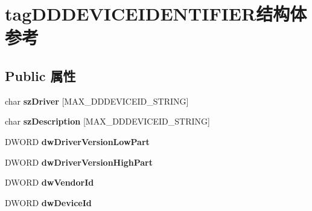 \hypertarget{structtag_d_d_d_e_v_i_c_e_i_d_e_n_t_i_f_i_e_r}{}\section{tag\+D\+D\+D\+E\+V\+I\+C\+E\+I\+D\+E\+N\+T\+I\+F\+I\+E\+R结构体 参考}
\label{structtag_d_d_d_e_v_i_c_e_i_d_e_n_t_i_f_i_e_r}
\subsection*{Public 属性}
\begin{DoxyCompactItemize}
\item 
\mbox{\label{structtag_d_d_d_e_v_i_c_e_i_d_e_n_t_i_f_i_e_r_ad63b03ed6997913f28b68de810a31218}} 
char {\bfseries sz\+Driver} \mbox{[}M\+A\+X\+\_\+\+D\+D\+D\+E\+V\+I\+C\+E\+I\+D\+\_\+\+S\+T\+R\+I\+NG\mbox{]}
\item 
\mbox{\label{structtag_d_d_d_e_v_i_c_e_i_d_e_n_t_i_f_i_e_r_a6b7aaa2fa4df62a09d9e05c65a55cd1d}} 
char {\bfseries sz\+Description} \mbox{[}M\+A\+X\+\_\+\+D\+D\+D\+E\+V\+I\+C\+E\+I\+D\+\_\+\+S\+T\+R\+I\+NG\mbox{]}
\item 
\mbox{\label{structtag_d_d_d_e_v_i_c_e_i_d_e_n_t_i_f_i_e_r_aef56ebd870d9dd0ce80d559bb58a2115}} 
D\+W\+O\+RD {\bfseries dw\+Driver\+Version\+Low\+Part}
\item 
\mbox{\label{structtag_d_d_d_e_v_i_c_e_i_d_e_n_t_i_f_i_e_r_aebbd0d9b3bb70855f532233d423cfe0e}} 
D\+W\+O\+RD {\bfseries dw\+Driver\+Version\+High\+Part}
\item 
\mbox{\label{structtag_d_d_d_e_v_i_c_e_i_d_e_n_t_i_f_i_e_r_a067fd0f3a470c16b7171d1d93bd38471}} 
D\+W\+O\+RD {\bfseries dw\+Vendor\+Id}
\item 
\mbox{\label{structtag_d_d_d_e_v_i_c_e_i_d_e_n_t_i_f_i_e_r_a0aa44ecf4a360cf1fed5c31e8f89d342}} 
D\+W\+O\+RD {\bfseries dw\+Device\+Id}
\item 

\end{DoxyCompactItemize}
